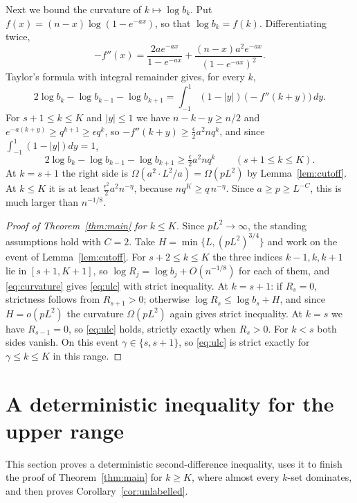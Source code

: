 \documentclass[11pt]{article}
\theoremstyle{remark}
\begin{document}
Next we bound the curvature of $k\mapsto\log b_k$. Put $f(x)=(n-x)\log(1-e^{-ax})$, so that $\log b_k=f(k)$. Differentiating twice,
\begin{equation}
 -f''(x)=\frac{2ae^{-ax}}{1-e^{-ax}}+
         \frac{(n-x)a^2e^{-ax}}{(1-e^{-ax})^2}.
 \label{eq:2der}
\end{equation}
Taylor's formula with integral remainder gives, for every $k$,
\begin{equation}
 2\log b_k-\log b_{k-1}-\log b_{k+1}=\int_{-1}^{1}(1-|y|)\,\big(-f''(k+y)\big)\,dy .
 \label{eq:triangle}
\end{equation}
For $s+1\le k\le K$ and $|y|\le1$ we have $n-k-y\ge n/2$ and $e^{-a(k+y)}\ge q^{k+1}\ge\epsilon q^k$, so $-f''(k+y)\ge\frac\epsilon2a^2nq^k$, and since $\int_{-1}^1(1-|y|)dy=1$,
\begin{equation}
 2\log b_k-\log b_{k-1}-\log b_{k+1}\ge\tfrac\epsilon2a^2nq^k\qquad(s+1\le k\le K).
 \label{eq:curvature}
\end{equation}
At $k=s+1$ the right side is $\Omega(a^2\cdot L^2/a)=\Omega(pL^2)$ by Lemma~\ref{lem:cutoff}. At $k\le K$ it is at least $\frac{\epsilon^2}2a^2n^{-\eta}$, because $nq^K\ge q\,n^{-\eta}$. Since $a\ge p\ge L^{-C}$, this is much larger than $n^{-1/8}$.

\begin{proof}[Proof of Theorem~\ref{thm:main} for $k\le K$]
Since $pL^2\to\infty$, the standing assumptions hold with $C=2$. Take $H=\min\{L,(pL^2)^{3/4}\}$ and work on the event of Lemma~\ref{lem:cutoff}. For $s+2\le k\le K$ the three indices $k-1,k,k+1$ lie in $[s+1,K+1]$, so $\log R_j=\log b_j+O(n^{-1/8})$ for each of them, and \eqref{eq:curvature} gives \eqref{eq:ulc} with strict inequality. At $k=s+1$: if $R_s=0$, strictness follows from $R_{s+1}>0$; otherwise $\log R_s\le\log b_s+H$, and since $H=o(pL^2)$ the curvature $\Omega(pL^2)$ again gives strict inequality. At $k=s$ we have $R_{s-1}=0$, so \eqref{eq:ulc} holds, strictly exactly when $R_s>0$. For $k<s$ both sides vanish. On this event $\gamma\in\{s,s+1\}$, so \eqref{eq:ulc} is strict exactly for $\gamma\le k\le K$ in this range.
\end{proof}

\section{A deterministic inequality for the upper range}\label{sec:tail}
This section proves a deterministic second-difference inequality, uses it to finish the proof of Theorem~\ref{thm:main} for $k\ge K$, where almost every $k$-set dominates, and then proves Corollary~\ref{cor:unlabelled}.
\end{document}
